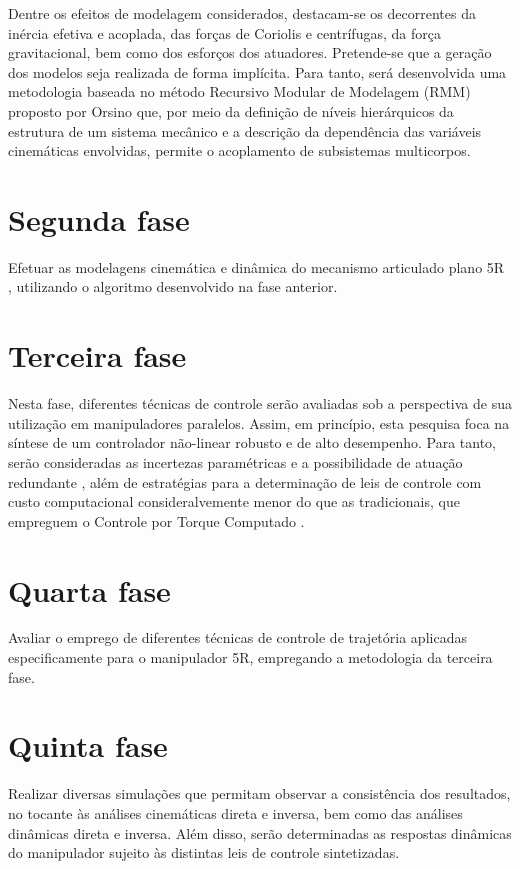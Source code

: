 \documentclass[]{politex}
\begin{document}
Dentre os efeitos de modelagem considerados, destacam-se os decorrentes da inércia efetiva e acoplada, das forças de Coriolis e centrífugas, da força gravitacional, bem como dos esforços dos atuadores. Pretende-se que a geração dos modelos seja realizada de forma implícita. Para tanto, será desenvolvida uma metodologia baseada no método Recursivo Modular de Modelagem (RMM) proposto por Orsino \cite{23orsino} que, por meio da definição de níveis hierárquicos da estrutura de um sistema mecânico e a descrição da dependência das variáveis cinemáticas envolvidas,  permite o acoplamento de subsistemas multicorpos.

\section{Segunda fase} 
Efetuar as modelagens cinemática e dinâmica do mecanismo articulado plano 5R \cite{22orsino}, utilizando o algoritmo desenvolvido na fase anterior.

\section{Terceira fase} 
Nesta fase, diferentes técnicas de controle serão avaliadas sob a perspectiva de sua utilização em manipuladores paralelos. Assim, em princípio, esta pesquisa foca na síntese de um controlador não-linear robusto e de alto desempenho. Para tanto, serão consideradas as incertezas paramétricas e a possibilidade de atuação redundante \cite{Cheng}, além de estratégias para a determinação de leis de controle com custo computacional consideralvemente menor do que as tradicionais, que empreguem o Controle por Torque Computado \cite{Craig, Zubizarreta}.

\section{Quarta fase} Avaliar o emprego de diferentes técnicas de controle de trajetória aplicadas especificamente para o manipulador 5R, empregando a metodologia da terceira fase.

\section{Quinta fase} Realizar diversas simulações que permitam observar a consistência dos resultados, no tocante às análises cinemáticas direta e inversa, bem como das análises dinâmicas direta e inversa. Além disso, serão determinadas as respostas dinâmicas do manipulador sujeito às distintas leis de controle sintetizadas.
\end{document}
